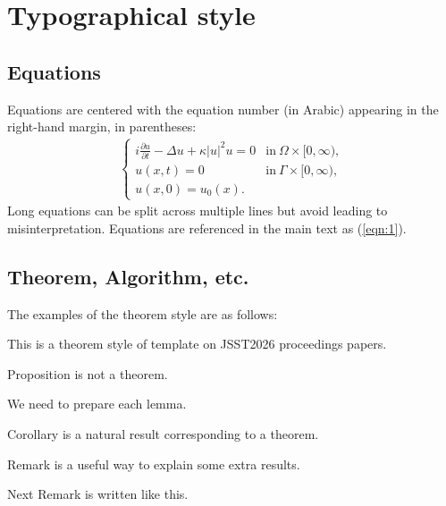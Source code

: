 \documentclass{jasse}%
\begin{document}
\section{Typographical style}
\subsection{Equations}
Equations are centered with the equation number (in Arabic) appearing in the right-hand margin, in
parentheses:
\begin{align}\label{eqn:1}
	\left\{
	\begin{array}{ll}
		i\displaystyle\frac{\partial u}{\partial t}-\Delta u+\kappa|u|^2u=0&\mbox{in}~\Omega\times[0,\infty),\\[2mm]
		u(x,t)=0&\mbox{in}~\Gamma\times[0,\infty),\\[2mm]
		u(x,0)=u_0(x).
	\end{array}
	\right.
\end{align}
Long equations can be split across multiple lines but avoid leading to misinterpretation.
Equations are referenced in the main text as (\ref{eqn:1}).

\subsection{Theorem, Algorithm, etc.}
The examples of the theorem style are as follows:

\begin{theorem}
This is a theorem style of template on JSST2026 proceedings papers.
\end{theorem}

\begin{proposition}
Proposition is not a theorem.
\end{proposition}

\begin{lemma}
We need to prepare each lemma.
\end{lemma}

\begin{corollary}
Corollary is a natural result corresponding to a theorem.
\end{corollary}

\begin{remark}
Remark is a useful way to explain some extra results.
\end{remark}

\begin{remark}
Next Remark is written like this.
\end{remark}
\end{document}
